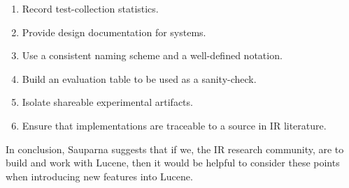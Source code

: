\begin{enumerate}
\item Record test-collection statistics.
\item Provide design documentation for systems.
\item Use a consistent naming scheme and a well-defined notation.
\item Build an evaluation table to be used as a sanity-check.
\item Isolate shareable experimental artifacts.
\item Ensure that implementations are traceable to a source in IR
  literature.
\end{enumerate}

In conclusion, Sauparna suggests that if we, the IR research
community, are to build and work with Lucene, then it would be helpful
to consider these points when introducing new features into Lucene.


